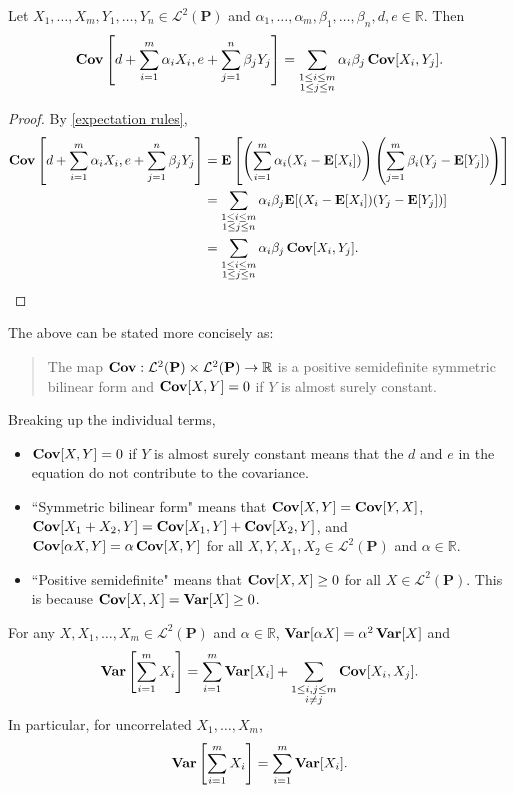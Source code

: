 \begin{theorem}
    Let $X_1,\ldots,X_m,Y_1,\ldots,Y_n\in\mathcal{L}^2(\textbf{P})$ and $\alpha_1,\ldots,\alpha_m,\beta_1,\ldots,\beta_n,d,e\in\mathbb{R}$. Then
    $$\operatorname{\textbf{Cov}}\left[d+\sum_{i=1}^m \alpha_iX_i, e+\sum_{j=1}^n \beta_jY_j\right]=\sum_{\substack{1\leq i\leq m \\ 1\leq j\leq n}} \alpha_i\beta_j \operatorname{\textbf{Cov}}[X_i, Y_j].$$
\end{theorem}

\begin{proof}
    By \cref{expectation rules},
    \begin{align*}
        \operatorname{\textbf{Cov}}\left[d+\sum_{i=1}^m \alpha_iX_i, e+\sum_{j=1}^n \beta_jY_j\right] &= \textbf{E}\left[\left(\sum_{i=1}^m \alpha_i(X_i-\textbf{E}[X_i])\right)\left(\sum_{j=1}^m \beta_i(Y_j-\textbf{E}[Y_j])\right)\right] \\
        &= \sum_{\substack{1\leq i\leq m \\1\leq j\leq n}} \alpha_i\beta_j \textbf{E}[(X_i-\textbf{E}[X_i])(Y_j-\textbf{E}[Y_j])] \\
        &= \sum_{\substack{1\leq i\leq m \\1\leq j\leq n}} \alpha_i\beta_j \operatorname{\textbf{Cov}}[X_i,Y_j].
    \end{align*}
\end{proof}

{
The above can be stated more concisely as:
\begin{quote}
The map $\operatorname{\textbf{Cov}}:\mathcal{L}^2(\textbf{P})\times\mathcal{L}^2(\textbf{P})\to\mathbb{R}$ is a positive semidefinite symmetric bilinear form and $\operatorname{\textbf{Cov}}[X,Y]=0$ if $Y$ is almost surely constant.
\end{quote}
}

Breaking up the individual terms,
\begin{itemize}
    \item $\operatorname{\textbf{Cov}}[X,Y]=0$ if $Y$ is almost surely constant means that the $d$ and $e$ in the equation do not contribute to the covariance.
    \item ``Symmetric bilinear form" means that $\operatorname{\textbf{Cov}}[X,Y]=\operatorname{\textbf{Cov}}[Y,X]$, $\operatorname{\textbf{Cov}}[X_1+X_2,Y]=\operatorname{\textbf{Cov}}[X_1,Y]+\operatorname{\textbf{Cov}}[X_2,Y]$, and $\operatorname{\textbf{Cov}}[\alpha X,Y]=\alpha\operatorname{\textbf{Cov}}[X,Y]$ for all $X,Y,X_1,X_2\in\mathcal{L}^2(\textbf{P})$ and $\alpha\in\mathbb{R}$.
    \item ``Positive semidefinite" means that $\operatorname{\textbf{Cov}}[X,X]\geq 0$ for all $X\in\mathcal{L}^2(\textbf{P})$. This is because $\operatorname{\textbf{Cov}}[X,X]=\operatorname{\textbf{Var}}[X]\geq 0$.
\end{itemize}

\begin{corollary}
\label{bienayme formula}
    For any $X,X_1,\ldots,X_m\in\mathcal{L}^2(\textbf{P})$ and $\alpha\in\mathbb{R}$, $\operatorname{\textbf{Var}}[\alpha X]=\alpha^2\operatorname{\textbf{Var}}[X]$ and
    $$\operatorname{\textbf{Var}}\left[\sum_{i=1}^m X_i\right]=\sum_{i=1}^m \operatorname{\textbf{Var}}[X_i] + \sum_{\substack{1\leq i,j\leq m \\ i\neq j}} \operatorname{\textbf{Cov}}[X_i, X_j].$$
    In particular, for uncorrelated $X_1,\ldots,X_m$,
    $$\operatorname{\textbf{Var}}\left[\sum_{i=1}^m X_i\right] = \sum_{i=1}^m \operatorname{\textbf{Var}}[X_i].$$
\end{corollary}

